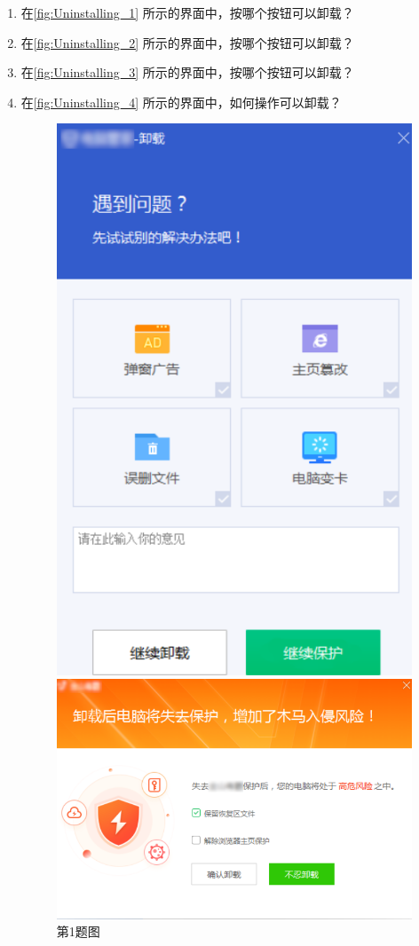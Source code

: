 \practice

\begin{enumerate}
  \item 在\autoref{fig:Uninstalling_1} 所示的界面中，按哪个按钮可以卸载？
  \item 在\autoref{fig:Uninstalling_2} 所示的界面中，按哪个按钮可以卸载？
  \item 在\autoref{fig:Uninstalling_3} 所示的界面中，按哪个按钮可以卸载？
  \item 在\autoref{fig:Uninstalling_4} 所示的界面中，如何操作可以卸载？
    \begin{figure}[htb!]
      \centering
      \begin{minipage}{.44\textwidth}
        \centering
        \includegraphics[width=.8\textwidth]{assets/basic/Uninstalling_1.png}
        \caption{第1题图}
        \label{fig:Uninstalling_1}
      \end{minipage}
      \begin{minipage}{.55\textwidth}
        \centering
        \includegraphics[width=.75\textwidth]{assets/basic/Uninstalling_2.png}

\end{minipage}
\end{figure}
\end{enumerate}
